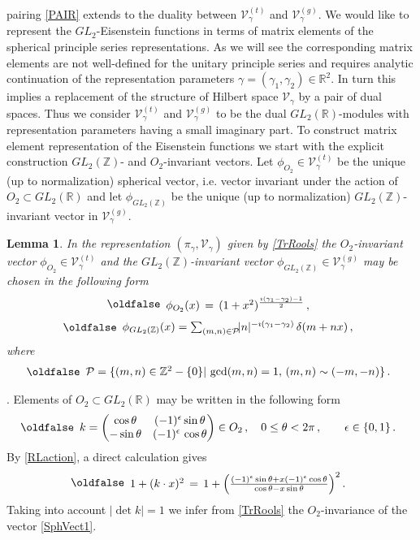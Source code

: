 \documentclass[12pt]{article}
\def\IR{\mathbb{R}}
\def\IZ{\mathbb{Z}}
\def\CP {\mathcal{P}}
\def\CV {\mathcal{V}}
\def\g {{\gamma}}
\def\e{\epsilon}
\newtheorem{lem}{Lemma}[section]
\newcommand{\proof}{\noindent {\it Proof}. }
\def\be{\begin{eqnarray}\new\begin{array}{cc}}
\def\ee{\end{array}\end{eqnarray}}
\newcounter{pac}[section]
\begin{document}
pairing \eqref{PAIR} extends to the duality between
$\CV_{\gamma}^{(t)}$ and $\CV_{\gamma}^{(g)}$. We would like to
represent the $GL_2$-Eisenstein functions in terms of matrix
elements of the spherical principle series representations. As we
will see the corresponding matrix elements are not well-defined for
the unitary principle series and requires analytic continuation of
the representation parameters $\gamma=(\gamma_1,\gamma_2)\in \IR^2$.
In turn this implies a replacement of the structure of Hilbert space
$\CV_\gamma$ by a pair of dual spaces. Thus we consider
$\CV_{\gamma}^{(t)}$ and $\CV_{\gamma}^{(g)}$ to be the dual
$GL_2(\IR)$-modules  with representation parameters having a small
imaginary part. To construct matrix element representation of the
Eisenstein functions we start with the  explicit construction
$GL_2(\IZ)$- and $O_2$-invariant vectors. Let
$\phi_{O_2}\in\CV_{\g}^{(t)}$ be the unique (up to normalization)
spherical vector, i.e. vector invariant under the action of
$O_2\subset GL_2(\IR)$ and let $\phi_{GL_2(\IZ)}$ be the unique (up
to normalization) $GL_2(\IZ)$-invariant vector in $\CV_{\g}^{(g)}$.


\begin{lem} In the representation $(\pi_\gamma,\CV_\gamma)$ given by \eqref{TrRools}
  the $O_2$-invariant vector $\phi_{O_2}\in\CV_{\g}^{(t)}$ and
the  $GL_2(\IZ)$-invariant vector $\phi_{GL_2(\IZ)}\in\CV_{\g}^{(g)}$
may be chosen in the following form
 \be\label{SphVect1}
  \phi_{O_2}(x)\,
  =\,(1+x^2)^{\frac{\imath(\gamma_1-\gamma_2)-1}{2}}\,,
 \ee
 \be \label{SphVect2}
  \phi_{GL_2(\IZ)}(x)=\sum_{(m,n)\in \CP}\!\!
  |n|^{-\imath(\gamma_1-\gamma_2)}\, \delta(m+nx)\,,
  \ee
  where
 \be\label{Range}
  \CP=\{ (m,n)\in \IZ^2-\{0\}|\,\, {\rm gcd}(m,n)=1,\, (m,n)\sim
  (-m,-n)\}\,.
 \ee
\end{lem}

\proof Elements of $O_2\subset GL_2(\IR)$
may be written in the following form
 \be
  k=\begin{pmatrix} \cos \theta & (-1)^\epsilon \sin \theta
    \\-\sin\theta &(-1)^\epsilon\,   \cos\theta
  \end{pmatrix} \in O_2\,,\quad0\leq\theta<2\pi\,, \qquad \epsilon\in \{0,1\}\,.
 \ee
  By \eqref{RLaction}, a direct calculation gives
  \be
  1+(k\cdot x)^2\,
  =\,1+\Big(\frac{(-1)^{\e}\sin\theta+x(-1)^{\e}\cos\theta}
  {\cos\theta-x\sin\theta}\Big)^2\,.
  \ee
Taking into account $|\det k|=1$ we infer from \eqref{TrRools}
  the $O_2$-invariance of the vector \eqref{SphVect1}.
\end{document}
